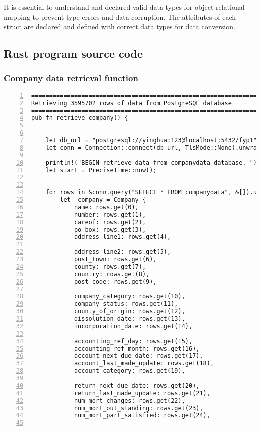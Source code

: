It is essential to understand and declared valid data types for object relational mapping to prevent type errors and data corruption. The attributes of each struct are declared and defined with correct data types for data conversion.



\subsection{Rust program source code}

\subsubsection{Company data retrieval function}

\lstset{basicstyle=\ttfamily\tiny}  
\begin{lstlisting}[breaklines, frame=single, numbers=left, caption={Function for company data retrieval. (company.rs)}, label=commandline-02]
=============================================================================
Retrieving 3595702 rows of data from PostgreSQL database 
=============================================================================
pub fn retrieve_company() {


	let db_url = "postgresql://yinghua:123@localhost:5432/fyp1";
	let conn = Connection::connect(db_url, TlsMode::None).unwrap();
	
	println!("BEGIN retrieve data from companydata database. ");
	let start = PreciseTime::now();
	
	
	for rows in &conn.query("SELECT * FROM companydata", &[]).unwrap() {
		let _company = Company {
			name: rows.get(0),
			number: rows.get(1),
			careof: rows.get(2),
			po_box: rows.get(3),
			address_line1: rows.get(4),
			
			address_line2: rows.get(5),
			post_town: rows.get(6),
			county: rows.get(7),
			country: rows.get(8),
			post_code: rows.get(9),
			
			company_category: rows.get(10),
			company_status: rows.get(11),
			county_of_origin: rows.get(12),
			dissolution_date: rows.get(13),
			incorporation_date: rows.get(14),
			
			accounting_ref_day: rows.get(15),
			accounting_ref_month: rows.get(16),
			account_next_due_date: rows.get(17),
			account_last_made_update: rows.get(18),
			account_category: rows.get(19),
			
			return_next_due_date: rows.get(20),
			return_last_made_update: rows.get(21),
			num_mort_changes: rows.get(22),
			num_mort_out_standing: rows.get(23),
			num_mort_part_satisfied: rows.get(24),
			

\end{lstlisting}
